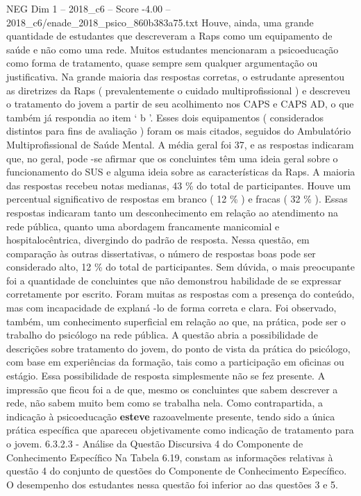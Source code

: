 \begin{textsample}{NEG Dim 1 – 2018\_c6 – Score -4.00 – 2018\_c6/enade\_2018\_psico\_860b383a75.txt}
Houve, ainda, uma grande quantidade de estudantes que descreveram a Raps como um equipamento de saúde e não como uma rede.
Muitos estudantes mencionaram a psicoeducação como forma de tratamento, quase sempre sem qualquer argumentação ou justificativa.
Na grande maioria das respostas corretas, o estrudante apresentou as diretrizes da Raps ( prevalentemente o cuidado multiprofissional ) e descreveu o tratamento do jovem a partir de seu acolhimento nos CAPS e CAPS AD, o que também já respondia ao item ‘ b ’.
Esses dois equipamentos ( considerados distintos para fins de avaliação ) foram os mais citados, seguidos do Ambulatório Multiprofissional de Saúde Mental.
A média geral foi 37, e as respostas indicaram que, no geral, pode -se afirmar que os concluintes têm uma ideia geral sobre o funcionamento do SUS e alguma ideia sobre as características da Raps.
A maioria das respostas recebeu notas medianas, 43 \% do total de participantes.
Houve um percentual significativo de respostas em branco ( 12 \% ) e fracas ( 32 \% ).
Essas respostas indicaram tanto um desconhecimento em relação ao atendimento na rede pública, quanto uma abordagem francamente manicomial e hospitalocêntrica, divergindo do padrão de resposta.
Nessa questão, em comparação às outras dissertativas, o número de respostas boas pode ser considerado alto, 12 \% do total de participantes.
Sem dúvida, o mais preocupante foi a quantidade de concluintes que não demonstrou habilidade de se expressar corretamente por escrito.
Foram muitas as respostas com a presença do conteúdo, mas com incapacidade de explaná -lo de forma correta e clara.
Foi observado, também, um conhecimento superficial em relação ao que, na prática, pode ser o trabalho do psicólogo na rede pública.
A questão abria a possibilidade de descrições sobre tratamento do jovem, do ponto de vista da prática do psicólogo, com base em experiências da formação, tais como a participação em oficinas ou estágio.
Essa possibilidade de resposta simplesmente não se fez presente.
A impressão que ficou foi a de que, mesmo os concluintes que sabem descrever a rede, não sabem muito bem como se trabalha nela.
Como contrapartida, a indicação à psicoeducação \textbf{esteve} razoavelmente presente, tendo sido a única prática específica que apareceu objetivamente como indicação de tratamento para o jovem. 6.3.2.3 - Análise da Questão Discursiva 4 do Componente de Conhecimento Específico Na Tabela 6.19, constam as informações relativas à questão 4 do conjunto de questões do Componente de Conhecimento Específico.
O desempenho dos estudantes nessa questão foi inferior ao das questões 3 e 5.

\end{textsample}
